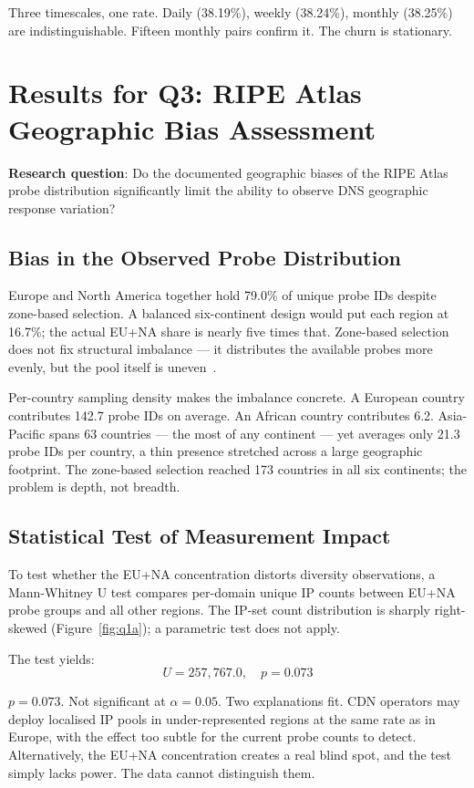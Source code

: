 Three timescales, one rate. Daily (38.19\%), weekly (38.24\%), monthly (38.25\%) are indistinguishable. Fifteen monthly pairs confirm it. The churn is stationary.

\bigskip
\section{Results for Q3: RIPE Atlas Geographic Bias Assessment}
\label{sec:4.4}

\textbf{Research question}: Do the documented geographic biases of the RIPE Atlas probe distribution significantly limit the ability to observe DNS geographic response variation?

\subsection{Bias in the Observed Probe Distribution}
\label{subsec:4.4.1}

Europe and North America together hold 79.0\% of unique probe IDs despite zone-based selection. A balanced six-continent design would put each region at 16.7\%; the actual EU+NA share is nearly five times that. Zone-based selection does not fix structural imbalance --- it distributes the available probes more evenly, but the pool itself is uneven~\cite{Bajpai2017}.

Per-country sampling density makes the imbalance concrete. A European country contributes 142.7 probe IDs on average. An African country contributes 6.2. Asia-Pacific spans 63 countries --- the most of any continent --- yet averages only 21.3 probe IDs per country, a thin presence stretched across a large geographic footprint. The zone-based selection reached 173 countries in all six continents; the problem is depth, not breadth.

\subsection{Statistical Test of Measurement Impact}
\label{subsec:4.4.2}

To test whether the EU+NA concentration distorts diversity observations, a Mann-Whitney U test compares per-domain unique \ac{IP} counts between EU+NA probe groups and all other regions. The \ac{IP}-set count distribution is sharply right-skewed (Figure~\ref{fig:q1a}); a parametric test does not apply.

The test yields:
\[
U = 257{,}767.0, \quad p = 0.073
\]

$p = 0.073$. Not significant at $\alpha = 0.05$. Two explanations fit. \ac{CDN} operators may deploy localised \ac{IP} pools in under-represented regions at the same rate as in Europe, with the effect too subtle for the current probe counts to detect. Alternatively, the EU+NA concentration creates a real blind spot, and the test simply lacks power. The data cannot distinguish them.

